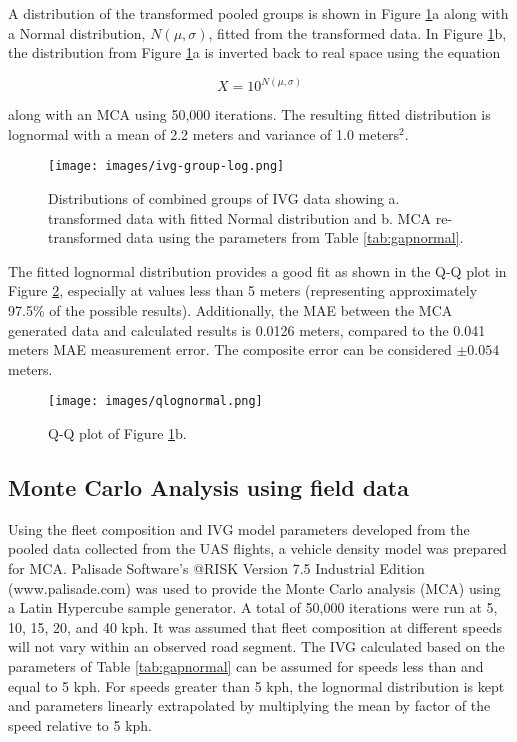 \documentclass[preprint,12pt,a4paper,authoryear]{elsarticle}
\begin{document}
\begin{linenumbers}
A distribution of the transformed pooled groups is shown in Figure \ref{fig:ivgloggroup}a along with a Normal distribution, $N(\mu,\sigma)$, fitted from the transformed data. In Figure \ref{fig:ivgloggroup}b, the distribution from Figure \ref{fig:ivgloggroup}a is inverted back to real space using the equation

\begin{equation}
\label{inverse-10}
X = 10^{N(\mu,\sigma)}
\end{equation}

along with an MCA using 50,000 iterations. The resulting fitted distribution is lognormal with a mean of 2.2 meters and variance of 1.0 meters$^{2}$. 
 
\begin{figure}[H]
\texttt{[image: images/ivg-group-log.png]} 
\caption[Distributions of combined groups of IVG data.]{Distributions of combined groups of IVG data showing a. transformed data with fitted Normal distribution and b. MCA re-transformed data using the parameters from Table \ref{tab:gapnormal}.}
\label{fig:ivgloggroup}
\end{figure}

The fitted lognormal distribution provides a good fit as shown in the Q-Q plot in Figure \ref{fig:qlognormal}, especially at values less than 5 meters (representing approximately 97.5\% of the possible results). Additionally, the MAE between the MCA generated data and calculated  results is 0.0126 meters, compared to the 0.041 meters MAE measurement error. The composite error can be considered $\pm 0.054$ meters.

\begin{figure}[H]
\texttt{[image: images/qlognormal.png]} 
\caption{Q-Q plot of Figure \ref{fig:ivgloggroup}b.}
\label{fig:qlognormal}
\end{figure}


\clearpage
\subsection{Monte Carlo Analysis using field data}
Using the fleet composition and IVG model parameters developed from the pooled data collected from the UAS flights, a vehicle density model was prepared for MCA. Palisade Software’s @RISK Version 7.5 Industrial Edition (www.palisade.com) was used to provide the Monte Carlo analysis (MCA) using a Latin Hypercube sample generator.  A total of 50,000 iterations were run at 5, 10, 15, 20, and 40 kph. It was assumed that fleet composition at different speeds will not vary within an observed road segment. The IVG calculated based on the parameters of Table \ref{tab:gapnormal} can be assumed for speeds less than and equal to 5 kph. For speeds greater than 5 kph, the lognormal distribution is kept and parameters linearly extrapolated by multiplying the mean by factor of the speed relative to 5 kph.  


\end{linenumbers}
\end{document}
